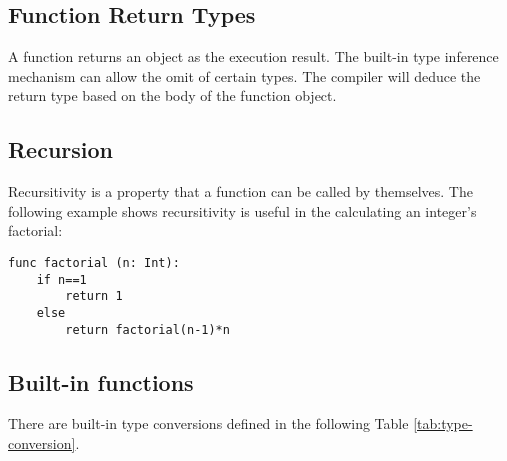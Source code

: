\documentclass[11pt]{article}
\begin{document}
\subsection{Function Return Types}
A function returns an object as the execution result. The built-in type inference mechanism can allow the omit of certain types. The compiler will deduce the return type based on the body of the function object. 

\subsection{Recursion} 
Recursitivity is a property that a function can be called by themselves. The following example shows recursitivity is useful in the calculating an integer's factorial:
\begin{lstlisting}
func factorial (n: Int):
	if n==1
		return 1
	else
		return factorial(n-1)*n
\end{lstlisting}
\subsection{Built-in functions}
There are built-in type conversions defined in the following Table \ref{tab:type-conversion}.
\end{document}
